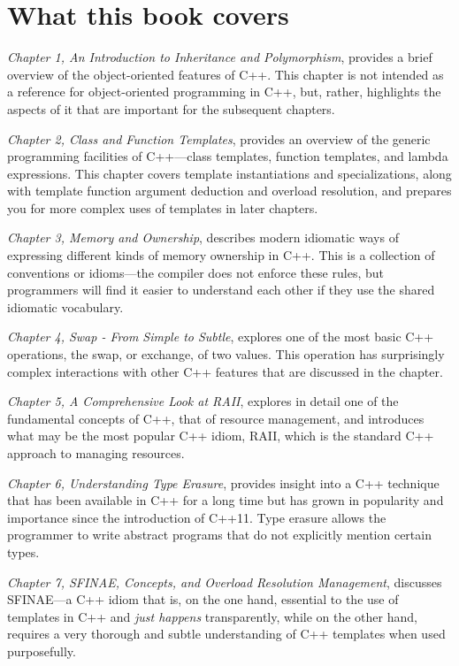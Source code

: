 \section{What this book covers}

\emph{Chapter 1, An Introduction to Inheritance and Polymorphism}, provides a brief overview of the object-oriented features of C++. This chapter is not intended as a reference for object-oriented programming in C++, but, rather, highlights the aspects of it that are important for the subsequent chapters.

\emph{Chapter 2, Class and Function Templates}, provides an overview of the generic programming facilities of C++---class templates, function templates, and lambda expressions. This chapter covers template instantiations and specializations, along with template function argument deduction and overload resolution, and prepares you for more complex uses of templates in later chapters.

\emph{Chapter 3, Memory and Ownership}, describes modern idiomatic ways of expressing different kinds of memory ownership in C++. This is a collection of conventions or idioms---the compiler does not enforce these rules, but programmers will find it easier to understand each other if they use the shared idiomatic vocabulary.

\emph{Chapter 4, Swap - From Simple to Subtle}, explores one of the most basic C++ operations, the swap, or exchange, of two values. This operation has surprisingly complex interactions with other C++ features that are discussed in the chapter.

\emph{Chapter 5, A Comprehensive Look at RAII}, explores in detail one of the fundamental concepts of C++, that of resource management, and introduces what may be the most popular C++ idiom, RAII, which is the standard C++ approach to managing resources.

\emph{Chapter 6, Understanding Type Erasure}, provides insight into a C++ technique that has been available in C++ for a long time but has grown in popularity and importance since the introduction of C++11. Type erasure allows the programmer to write abstract programs that do not explicitly mention certain types.

\emph{Chapter 7, SFINAE, Concepts, and Overload Resolution Management}, discusses SFINAE---a C++ idiom that is, on the one hand, essential to the use of templates in C++ and \emph{just happens} transparently, while on the other hand, requires a very thorough and subtle understanding of C++ templates when used purposefully.

